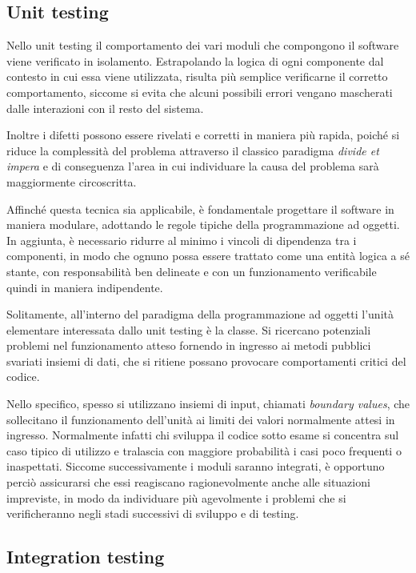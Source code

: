\subsection{Unit testing}
Nello unit testing il comportamento dei vari moduli che compongono il software viene verificato in isolamento. Estrapolando la logica di ogni componente dal contesto in cui essa viene utilizzata, risulta più semplice verificarne il corretto comportamento, siccome si evita che alcuni possibili errori vengano mascherati dalle interazioni con il resto del sistema. 

Inoltre i difetti possono essere rivelati e corretti in maniera più rapida, poiché si riduce la complessità del problema attraverso il classico paradigma \emph{divide et impera} e di conseguenza l'area in cui individuare la causa del problema sarà maggiormente circoscritta.

Affinché questa tecnica sia applicabile, è fondamentale progettare il software in maniera modulare, adottando le regole tipiche della programmazione ad oggetti. In aggiunta, è necessario ridurre al minimo i vincoli di dipendenza tra i componenti, in modo che ognuno possa essere trattato come una entità logica a sé stante, con responsabilità ben delineate e con un funzionamento verificabile quindi in maniera indipendente.

Solitamente, all'interno del paradigma della programmazione ad oggetti l'unità elementare interessata dallo unit testing è la classe. Si ricercano potenziali problemi nel funzionamento atteso fornendo in ingresso ai metodi pubblici
svariati insiemi di dati, che si ritiene possano provocare comportamenti critici del codice. 

Nello specifico, spesso si utilizzano insiemi di input, chiamati \emph{boundary values}, che sollecitano il funzionamento dell'unità ai limiti dei valori normalmente attesi in ingresso. 
Normalmente infatti chi sviluppa il codice sotto esame si concentra sul caso tipico di utilizzo e tralascia con maggiore probabilità i casi poco frequenti o inaspettati. Siccome successivamente i moduli saranno integrati, è opportuno perciò assicurarsi che essi reagiscano ragionevolmente anche alle situazioni impreviste, in modo da individuare più agevolmente i problemi che si verificheranno negli stadi successivi di sviluppo e di testing.

\subsection{Integration testing}

